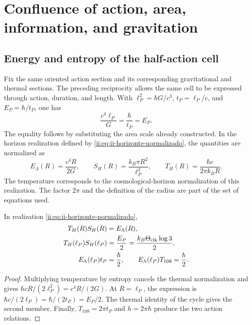 \section{Confluence of action, area, information, and gravitation}
\label{ii:sec:confluencia}

\subsection{Energy and entropy of the half-action cell}

Fix the same oriented action section and its corresponding
gravitational and thermal sections. The preceding reciprocity allows the same cell to be expressed through
action, duration, and length. With
\(\ell_P^2=\hbar G/c^3\), \(t_P=\ell_P/c\), and
\(E_P=\hbar/t_P\), one has
\[
 \frac{c^4\ell_P}{G}=\frac{\hbar}{t_P}=E_P.
\]
The equality follows by substituting the area scale already constructed. In the
horizon realization defined by \eqref{ii:eq:ii-horizonte-normalizado}, the quantities
are normalized as
\begin{equation}
 E_\Lambda(R)=\frac{c^4R}{2G},\qquad
 S_H(R)=\frac{k_B\pi R^2}{\ell_P^2},\qquad
 T_H(R)=\frac{\hbar c}{2\pi k_BR}.
 \label{ii:eq:ii-horizonte-normalizado}
\end{equation}
The temperature corresponds to the cosmological-horizon normalization
of this realization. The factor \(2\pi\) and the definition of the radius
are part of the set of equations used.

\begin{theorem}
In realization \eqref{ii:eq:ii-horizonte-normalizado},
\begin{align}
 T_H(R)S_H(R)&=E_\Lambda(R),\\
 T_H(\ell_P)S_H(\ell_P)&=\frac{E_P}{2}
 =\frac{k_B\Theta_{\rm clk}\log3}{2},\\
 E_\Lambda(\ell_P)t_P&=\frac{\hbar}{2},\qquad
 E_\Lambda(\ell_P)T_{108}=\frac h2.
\end{align}
\end{theorem}
\begin{proof}
Multiplying temperature by entropy cancels the thermal
normalization and gives \(\hbar cR/(2\ell_P^2)=c^4R/(2G)\).
At \(R=\ell_P\), the expression is \(\hbar c/(2\ell_P)
=\hbar/(2t_P)=E_P/2\). The thermal identity of the cycle gives
the second member. Finally, \(T_{108}=2\pi t_P\) and
\(h=2\pi\hbar\) produce the two action relations.
\end{proof}

